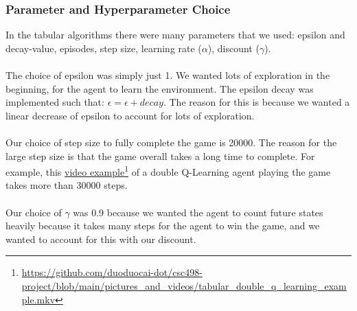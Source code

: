 \documentclass[twoside,11pt]{article}
\newcommand\fnurl[2]{%
  \href{#2}{#1}\footnote{\url{#2}}%
}
\begin{document}
\subsubsection{Parameter and Hyperparameter Choice}
In the tabular algorithms there were many parameters that we used: epsilon and decay-value, episodes, step size, learning rate ($\alpha$),  discount ($\gamma$).
\\\\
The choice of epsilon was simply just 1. We wanted lots of exploration in the beginning, for the agent to learn the environment. The epsilon decay was implemented such that: $\epsilon = \epsilon + decay$. The reason for this is because we wanted a linear decrease of epsilon to account for lots of exploration. 
\\\\
Our choice of step size to fully complete the game is 20000. The reason for the large step size is that the game overall takes a long time to complete. For example, this \fnurl{video example}{https://github.com/duoduocai-dot/csc498-project/blob/main/pictures_and_videos/tabular_double_q_learning_example.mkv} of a double Q-Learning agent playing the game takes more than 30000 steps.
\\\\
Our choice of $\gamma$ was 0.9 because we wanted the agent to count future states heavily because it takes many steps for the agent to win the game, and we wanted to account for this with our discount.
\end{document}
